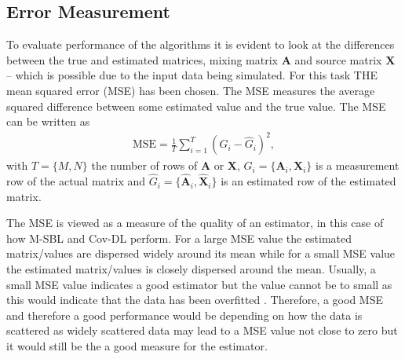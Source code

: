 \subsection{Error Measurement}  
To evaluate performance of the algorithms it is evident to look at the differences between the true and estimated matrices, mixing matrix $\mathbf{A}$ and source matrix $\mathbf{X}$ -- which is possible due to the input data being simulated. 
For this task THE mean squared error (MSE) has been chosen. 
The MSE measures the average squared difference between some estimated value and the true value. 
The MSE can be	 written as
\begin{align*}
\text{MSE} = \frac{1}{T} \sum_{i=1}^T (G_i - \hat{G}_i)^2,  
\end{align*}
with $T = \{M, N\}$ the number of rows of $\mathbf{A}$ or $\mathbf{X}$, $G_i = \{ \mathbf{A}_i, \mathbf{X}_i\}$ is a measurement row of the actual matrix and $\hat{G}_i = \{\hat{\mathbf{A}}_i,\hat{\mathbf{X}}_i\}$ is an estimated row of the estimated matrix.

The MSE is viewed as a measure of the quality of an estimator, in this case of how M-SBL and Cov-DL perform. 
For a large MSE value the estimated matrix/values are dispersed widely around its mean while for a small MSE value the estimated matrix/values is closely dispersed around the mean. 
Usually, a small MSE value indicates a good estimator but the value cannot be to small as this would indicate that the data has been overfitted . 
Therefore, a good MSE and therefore a good performance would be depending on how the data is scattered as widely scattered data may lead to a MSE value not close to zero but it would still be the a good measure for the estimator.
